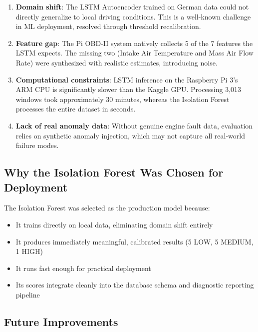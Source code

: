 \begin{enumerate}
    \item \textbf{Domain shift}: The LSTM Autoencoder trained on German data could not directly generalize to local driving conditions. This is a well-known challenge in ML deployment, resolved through threshold recalibration.

    \item \textbf{Feature gap}: The Pi OBD-II system natively collects 5 of the 7 features the LSTM expects. The missing two (Intake Air Temperature and Mass Air Flow Rate) were synthesized with realistic estimates, introducing noise.

    \item \textbf{Computational constraints}: LSTM inference on the Raspberry Pi 3's ARM CPU is significantly slower than the Kaggle GPU. Processing 3,013 windows took approximately 30 minutes, whereas the Isolation Forest processes the entire dataset in seconds.

    \item \textbf{Lack of real anomaly data}: Without genuine engine fault data, evaluation relies on synthetic anomaly injection, which may not capture all real-world failure modes.
\end{enumerate}

\subsection{Why the Isolation Forest Was Chosen for Deployment}

The Isolation Forest was selected as the production model because:
\begin{itemize}
    \item It trains directly on local data, eliminating domain shift entirely
    \item It produces immediately meaningful, calibrated results (5 LOW, 5 MEDIUM, 1 HIGH)
    \item It runs fast enough for practical deployment
    \item Its scores integrate cleanly into the database schema and diagnostic reporting pipeline
\end{itemize}

\subsection{Future Improvements}

